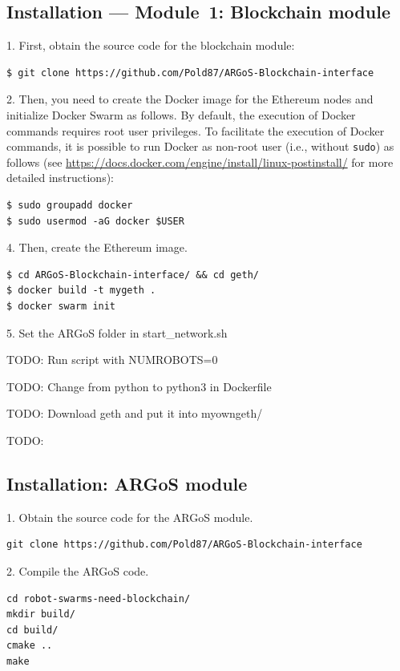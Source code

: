 \documentclass{article}
\begin{document}
\subsection{Installation --- Module~1: Blockchain module}

1. First, obtain the source code for the blockchain module:

\begin{verbatim}
$ git clone https://github.com/Pold87/ARGoS-Blockchain-interface
\end{verbatim}

2. Then, you need to create the Docker image for the Ethereum nodes and
initialize Docker Swarm as follows. By default, the execution of
Docker commands requires root user privileges. To facilitate the
execution of Docker commands, it is possible to run Docker as non-root
user (i.e., without \texttt{sudo}) as follows (see
\url{https://docs.docker.com/engine/install/linux-postinstall/} for
more detailed instructions):

\begin{verbatim}
$ sudo groupadd docker
$ sudo usermod -aG docker $USER
\end{verbatim}



4. Then, create the Ethereum image.

\begin{verbatim}
$ cd ARGoS-Blockchain-interface/ && cd geth/
$ docker build -t mygeth .
$ docker swarm init
\end{verbatim}

5. Set the ARGoS folder in start_network.sh

TODO: Run script with NUMROBOTS=0

TODO: Change from python to python3 in Dockerfile

TODO: Download geth and put it into myowngeth/

TODO: 

\subsection{Installation: ARGoS module}

1. Obtain the source code for the ARGoS module.

\begin{verbatim}
git clone https://github.com/Pold87/ARGoS-Blockchain-interface
\end{verbatim}

2. Compile the ARGoS code.
\begin{verbatim}
cd robot-swarms-need-blockchain/
mkdir build/
cd build/
cmake ..
make
\end{verbatim}
\end{document}
